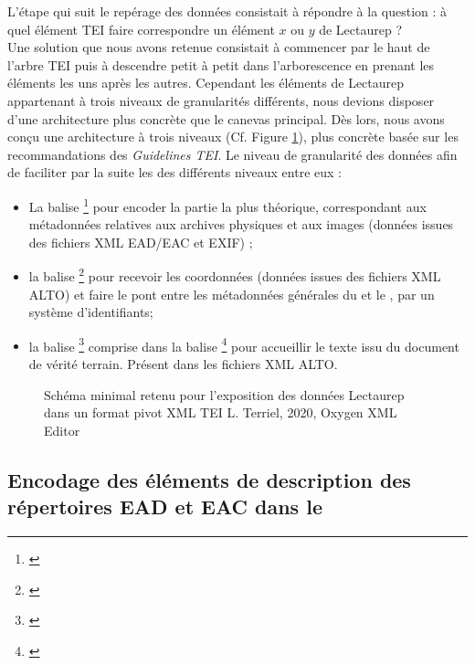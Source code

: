 L'étape qui suit le repérage des données consistait à répondre à la question : à quel élément TEI faire correspondre un élément $x$ ou $y$ de Lectaurep ?\\ 

Une solution que nous avons retenue consistait à commencer par le haut de l'arbre TEI puis à descendre petit à petit dans l'arborescence en prenant les éléments les uns après les autres. Cependant les éléments de Lectaurep appartenant à trois niveaux de granularités différents, nous devions disposer d'une architecture plus concrète que le canevas  principal. Dès lors, nous avons conçu une architecture à trois niveaux (Cf. Figure \ref{fig:structure_general_template_tei_lectaurep}), plus concrète basée sur les recommandations des \textit{Guidelines TEI}. Le niveau de granularité des données afin de faciliter par la suite les des différents niveaux entre eux : 
\begin{itemize}
    \item La balise \footnote{\cite{tei_tei_nodate}} pour encoder la partie la plus théorique, correspondant aux métadonnées relatives aux archives physiques et aux images (données issues des fichiers XML EAD/EAC et EXIF) ;
    \item la balise \footnote{\cite{tei_tei_nodate-2}} pour recevoir les coordonnées (données issues des fichiers XML ALTO) et faire le pont entre les métadonnées générales du  et le , par un système d'identifiants;
    \item la balise \footnote{\cite{tei_tei_nodate-3}} comprise dans la balise \footnote{\cite{tei_tei_nodate-1}} pour accueillir le texte issu du document de vérité terrain. Présent dans les fichiers XML ALTO.
\end{itemize}

\begin{figure}[h]
    \centering
    \centerline{}
    \caption{Schéma minimal retenu pour l'exposition des données Lectaurep dans un format pivot XML TEI \textcopyright L. Terriel, 2020, Oxygen XML Editor}
    \label{fig:structure_general_template_tei_lectaurep}
\end{figure}
\newpage

\subsection{Encodage des éléments de description des répertoires EAD et EAC dans le }

